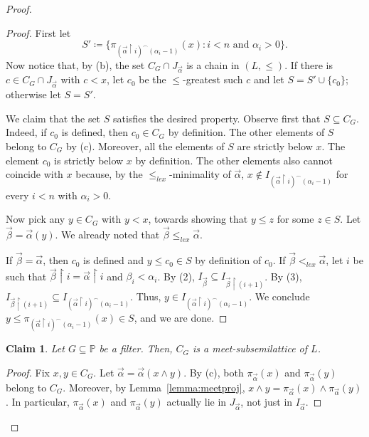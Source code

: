 \documentclass[]{amsart}
\newtheorem{claim}{Claim}[theorem]
\theoremstyle{definition}
\theoremstyle{remark}
\begin{document}
\begin{proof}
\begin{proof}
First let 
\[
S' \coloneqq \big\{\pi_{(\vec{\alpha} \upharpoonright i)^\smallfrown (\alpha_i - 1)}(x) : i < n \text{ and } \alpha_i > 0\big\}.
\]
Now notice that, by (b), the set $C_G \cap J_{\vec{\alpha}}$ is a chain in $(L, \le)$. If there is $c \in C_G \cap J_{\vec{\alpha}}$ with $c < x$, let $c_0$ be the $\le$-greatest such $c$ and let $S = S' \cup \{c_0\}$; otherwise let $S = S'$.

We claim that the set $S$ satisfies the desired property. Observe first that $S \subseteq C_G$. Indeed, if $c_0$ is defined, then $c_0 \in C_G$ by definition. The other elements of $S$ belong to $C_G$ by (c). Moreover, all the elements of $S$ are strictly below $x$. The element $c_0$ is strictly below $x$ by definition. The other elements also cannot coincide with $x$ because, by the $\le_{lex}$-minimality of $\vec{\alpha}$, $x \not\in I_{(\vec{\alpha} \upharpoonright i)^\smallfrown (\alpha_i - 1)}$ for every  $i < n$ with $\alpha_i > 0$.

Now pick any $y \in C_G$ with $y < x$, towards showing that $y \le z$ for some $z \in S$. Let $\vec{\beta} = \vec{\alpha}(y)$. We already noted that $\vec{\beta} \le_{lex} \vec{\alpha}$. 

If $\vec{\beta} = \vec{\alpha}$, then $c_0$ is defined and $y \le c_0 \in S$ by definition of $c_0$. If $\vec{\beta} <_{lex} \vec{\alpha}$, let $i$ be such that $\vec{\beta} \upharpoonright i = \vec{\alpha} \upharpoonright i$ and $\beta_i < \alpha_i$. By (2), $I_{\vec{\beta}} \subseteq I_{\vec{\beta} \upharpoonright (i+1)}$. By (3), $I_{\vec{\beta} \upharpoonright (i+1)} \subseteq I_{(\vec{\alpha} \upharpoonright i)^\smallfrown (\alpha_i-1)}$. Thus, $y \in I_{(\vec{\alpha} \upharpoonright i)^\smallfrown (\alpha_i-1)}$. We conclude $y \le \pi_{(\vec{\alpha} \upharpoonright i)^\smallfrown (\alpha_i-1)}(x) \in S$, and we are done.
\end{proof}

\begin{claim}
Let $G\subseteq \mathbb{P}$ be a filter. Then, $C_G$ is a meet-subsemilattice of $L$.
\end{claim}
\begin{proof}
Fix $x,y \in C_G$. Let $\vec{\alpha} = \vec{\alpha}(x \wedge y)$.  By (c), both $\pi_{\vec{\alpha}} (x)$ and $\pi_{\vec{\alpha}} (y)$ belong to $C_G$. Moreover, by Lemma~\ref{lemma:meetproj}, $x \wedge y = \pi_{\vec{\alpha}} (x) \wedge \pi_{\vec{\alpha}} (y)$. In particular, $ \pi_{\vec{\alpha}}(x)$ and $ \pi_{\vec{\alpha}}(y)$ actually lie in $J_{\vec{\alpha}}$, not just in $I_{\vec{\alpha}}$.


\end{proof}
\end{proof}
\end{document}
